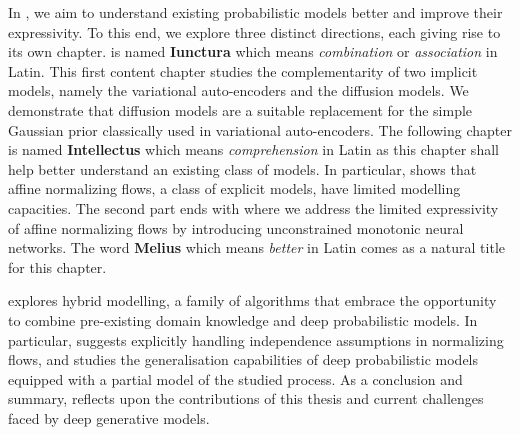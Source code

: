  In , we aim to understand existing probabilistic models better and improve their expressivity. To this end, we explore three distinct directions, each giving rise to its own chapter.  is named \textbf{Iunctura} which means \textit{combination} or \textit{association} in Latin. This first content chapter studies the complementarity of two implicit models, namely the variational auto-encoders and the diffusion models. We demonstrate that diffusion models are a suitable replacement for the simple Gaussian prior classically used in variational auto-encoders. The following chapter is named \textbf{Intellectus} which means \textit{comprehension} in Latin as this chapter shall help better understand an existing class of models. In particular,  shows that affine normalizing flows, a class of explicit models, have limited modelling capacities. The second part ends with  where we address the limited expressivity of affine normalizing flows by introducing unconstrained monotonic neural networks. The word \textbf{Melius} which means \textit{better} in Latin comes as a natural title for this chapter.

  explores hybrid modelling, a family of algorithms that embrace the opportunity to combine pre-existing domain knowledge and deep probabilistic models. In particular,  suggests explicitly handling independence assumptions in normalizing flows, and  studies the generalisation capabilities of deep probabilistic models equipped with a partial model of the studied process. As a conclusion and summary,  reflects upon the contributions of this thesis and current challenges faced by deep generative models.




